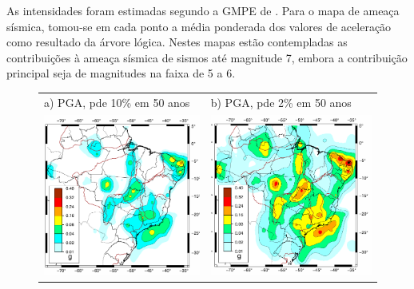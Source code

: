 \documentclass[jgrga]{agutex}
\begin{document}
\begin{article}
As intensidades foram estimadas segundo a GMPE de \citet{silva_2002}.  Para o mapa de ameaça sísmica, tomou-se em cada ponto a média ponderada dos valores de aceleração como resultado da árvore lógica. Nestes mapas estão contempladas as contribuições à ameaça sísmica de sismos até magnitude 7, embora a contribuição principal seja de magnitudes na faixa de 5 a 6.


\begin{figure}
\begin{tabular*}{\hsize}{
				p{0.5\hsize} 
				p{0.5\hsize}
				}
a) PGA, pde 10\% em 50 anos 
& 
b) PGA, pde 2\% em 50 anos 
\\ 
\includegraphics[height=\hsize]{img_hazard_10}
&
\includegraphics[height=\hsize]{img_hazard_02}

\end{tabular*}
\end{figure}
\end{article}
\end{document}

